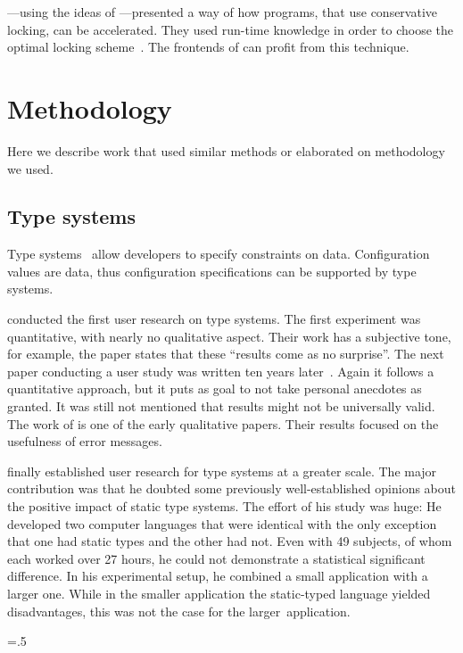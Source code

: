 \citet{osterlund2014concurrent}---using the ideas of \citet{ericsson2008composition}---presented a way of how programs, that use conservative locking, can be accelerated.
They used run-time knowledge in order to choose the optimal locking scheme~\cite{osterlund2017adaptive}.
The frontends of \elektra{} can profit from this technique.



\section{Methodology}
\label{sec:related-methodology}

Here we describe work that used similar methods or elaborated on methodology we used.

\subsection{Type systems}
\label{sec:related-type-systems}

Type systems~\cite{pierce2002types,guttag1977abstract,puntigam1995type,schwartzbach1994object,liskov1994behavioral,wegner1990concepts,cardelli1985understanding,puntigam1997coordination,puntigam2007see,puntigam2007black} allow developers to specify constraints on data.
Configuration values are data, thus configuration specifications can be supported by type systems.

\citet{gannon1977experimental} conducted the first user research on type systems.
The first experiment was quantitative, with nearly no qualitative aspect.
Their work has a subjective tone, for example, the paper states that these \enquote{results come as no surprise}.
The next paper conducting a user study was written ten years later~\cite{prechelt1998controlled}.
Again it follows a quantitative approach, but it puts as goal to not take personal anecdotes as granted.
It was still not mentioned that results might not be universally valid.
The work of \citet{daly2009work} is one of the early qualitative papers.
Their results focused on the usefulness of error messages.

\citet{hanenberg2010experiment} finally established user research for type systems at a greater scale.
The major contribution was that he doubted some previously well-established opinions about the positive impact of static type systems.
The effort of his study was huge:
He developed two computer languages that were identical with the only exception that one had static types and the other had not.
Even with 49 subjects, of whom each worked over 27 hours, he could not demonstrate a statistical significant difference.
In his experimental setup, he combined a small application with a larger one.
While in the smaller application the static-typed language yielded disadvantages, this was not the case for the larger~application.%
{\parfillskip=0pt \emergencystretch=.5\textwidth \par}


